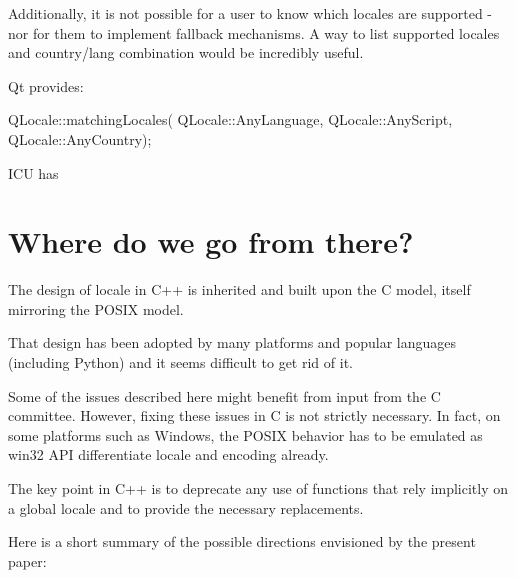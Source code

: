 \documentclass{wg21}
\begin{document}
Additionally, it is not possible for a user to know which locales are supported - nor for them to implement fallback mechanisms.
A way to list supported locales and country/lang combination would be incredibly useful. 

Qt provides:

\begin{codeblock}
    QLocale::matchingLocales( QLocale::AnyLanguage, QLocale::AnyScript, QLocale::AnyCountry);
\end{codeblock}

ICU has 

\section{Where do we go from there?}

The design of locale in C++ is inherited and built upon the C model, itself mirroring the POSIX model.

That design has been adopted by many platforms and popular languages (including Python) and it seems difficult to get rid of it.

Some of the issues described here might benefit from input from the C committee.
However, fixing these issues in C is not strictly necessary.
In fact, on some platforms such as Windows, the POSIX behavior has to be emulated as win32 API differentiate locale and encoding already.

The key point in C++ is to deprecate any use of functions that rely implicitly on a global locale and to provide the necessary replacements.

Here is a short summary of the possible directions envisioned by the present paper:
\end{document}
